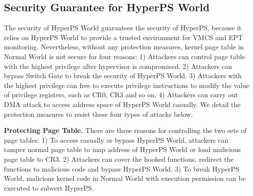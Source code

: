 ﻿\documentclass[conference]{IEEEtran}
\begin{document}
\subsection{Security Guarantee for HyperPS World}\label {SG}
The security of HyperPS World guarantees the security of HyperPS, because it relies on HyperPS World to provide a trusted environment for VMCS and EPT monitoring.
Nevertheless, without any protection measures, kernel page table in Normal World is not secure for four reasons: 1) Attackers can control page table with the highest privilege after hypervisor is compromised. 2) Attackers can bypass Switch Gate to break the security of HyperPS World. 3) Attackers with the highest privilege can free to execute privilege instructions to modify the value of privilege registers, such as CR0, CR3 and so on. 4) Attackers can carry out DMA attack to access address space of HyperPS World casually.
We detail the protection measures to resist these four types of attacks below.



\textbf{Protecting Page Table.}
There are three reasons for controlling the two sets of page tables: 1) To access casually or bypass HyperPS World, attackers can tamper normal page table to map address of HyperPS World or load malicious page table to CR3.
2) Attackers can cover the hooked functions, redirect the functions to malicious code and bypass HyperPS World.
 3) To break HyperPS World, malicious kernel code in Normal World with execution permission can be executed to subvert HyperPS.
\end{document}
